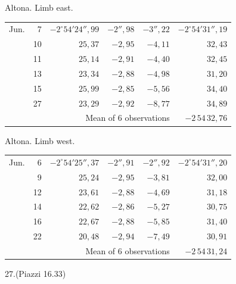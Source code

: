 \noindent\begin{minipage}[t]{.495\textwidth}\centering Altona. Limb east.\par\smallskip
{\scriptsize\setlength{\tabcolsep}{1pt}\renewcommand{\arraystretch}{1.2}\begin{tabular}{lr|r|r|r|r|}
Jun.&7&$-2^\circ54'24''{,}99$&$-2''{,}98$&$-3''{,}22$&$-2^\circ54'31''{,}19$\\
&10&$25{,}37$&$-2{,}95$&$-4{,}11$&$32{,}43$\\
&11&$25{,}14$&$-2{,}91$&$-4{,}40$&$32{,}45$\\
&13&$23{,}34$&$-2{,}88$&$-4{,}98$&$31{,}20$\\
&15&$25{,}99$&$-2{,}85$&$-5{,}56$&$34{,}40$\\
&27&$23{,}29$&$-2{,}92$&$-8{,}77$&$34{,}89$\\
\cline{6-6}\multicolumn{5}{r}{Mean of 6 observations}&$-2\,54\,32{,}76$
\end{tabular}}\end{minipage}\hfill\begin{minipage}[t]{.495\textwidth}\centering Altona. Limb west.\par\smallskip
{\scriptsize\setlength{\tabcolsep}{1pt}\renewcommand{\arraystretch}{1.2}\begin{tabular}{lr|r|r|r|r}
Jun.&6&$-2^\circ54'25''{,}37$&$-2''{,}91$&$-2''{,}92$&$-2^\circ54'31''{,}20$\\
&9&$25{,}24$&$-2{,}95$&$-3{,}81$&$32{,}00$\\
&12&$23{,}61$&$-2{,}88$&$-4{,}69$&$31{,}18$\\
&14&$22{,}62$&$-2{,}86$&$-5{,}27$&$30{,}75$\\
&16&$22{,}67$&$-2{,}88$&$-5{,}85$&$31{,}40$\\
&22&$20{,}48$&$-2{,}94$&$-7{,}49$&$30{,}91$\\
\cline{6-6}\multicolumn{5}{r}{Mean of 6 observations}&$-2\,54\,31{,}24$
\end{tabular}}\end{minipage}
\par\vspace{4mm}
\begin{center}27.\quad (Piazzi 16.33)\end{center}

